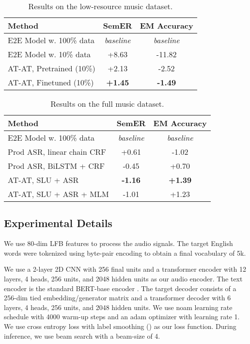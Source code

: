 \documentclass[letterpaper]{article} \usepackage{aaai21}  \usepackage{times}  \usepackage{helvet} \usepackage{courier}  \usepackage[hyphens]{url}  \usepackage{graphicx} \usepackage{booktabs}
\begin{document}
\begin{table}
\begin{tabular}{lcc}
\toprule
\bf Method & \bf{SemER} & \bf{EM Accuracy} \\
\midrule
E2E Model w. 100\% data & \emph{baseline} & \emph{baseline} \\
E2E Model w. 10\% data & +8.63 & -11.82 \\
\midrule
AT-AT, Pretrained (10\%) & +2.13 & -2.52 \\
AT-AT, Finetuned (10\%) & \bf +1.45 & \bf -1.49 \\
\bottomrule
\end{tabular}
\caption{
    Results on the low-resource music dataset. 
}
\label{tab:music1}
\end{table}

\begin{table}
\begin{tabular}{lcc}
\toprule
\bf Method & \bf{SemER} & \bf{EM Accuracy} \\
\midrule
E2E Model w. 100\% data & \emph{baseline} & \emph{baseline} \\
Prod ASR, linear chain CRF & +0.61 & -1.02\\
Prod ASR, BiLSTM + CRF & -0.45 & +0.70 \\
\midrule
AT-AT, SLU + ASR & \bf -1.16 & \bf +1.39 \\
AT-AT, SLU + ASR + MLM & -1.01 & +1.23 \\
\bottomrule
\end{tabular}
\caption{
    Results on the full music dataset. 
}
\label{tab:music2}
\end{table}

\subsection{Experimental Details}
We use 80-dim LFB features to process the audio signals. The target English words were tokenized using byte-pair encoding to obtain a final vocabulary of 5k.

We use a 2-layer 2D CNN with 256 final units and a transformer encoder with 12 layers, 4 heads, 256 units, and 2048 hidden units as our audio encoder. The text encoder is the standard BERT-base encoder \cite{devlin2018bert}. The target decoder consists of a 256-dim tied embedding/generator matrix and a transformer decoder with 6 layers, 4 heads, 256 units, and 2048 hidden units. We use noam learning rate schedule with 4000 warm-up steps and an adam optimizer with learning rate 1. We use cross entropy loss with label smoothing () as our loss function. During inference, we use beam search with a beam-size of 4.
\end{document}
